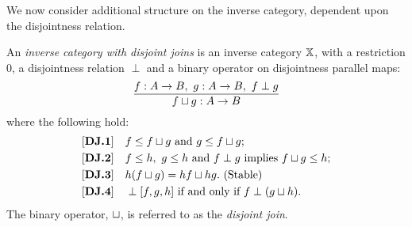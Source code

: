 We now consider additional structure on the inverse category, dependent upon the disjointness
relation.
\begin{definition}\label{def:disjoint_join}
  An \emph{inverse category with disjoint joins} is an inverse category $\mathbb{X}$, with a restriction
  $0$, a disjointness relation $\perp$ and a binary operator on disjointness parallel maps:
  \[
    \infer{f \djoin g : A \to B}{f: A\to B,\ g: A\to B,\ f \perp g}
  \]
  where the following hold:
  \begin{align*}
    \axiom{DJ}{1}\quad & f \le f \djoin g\text{ and }g \le f \djoin g; \\
    \axiom{DJ}{2}\quad & f \le h,\ g \le h\text{ and }f\perp g\text{ implies }f \djoin g \le h;\\
    \axiom{DJ}{3}\quad & h(f \djoin g) = h f \djoin h g. \text{ (Stable)} \\
    \axiom{DJ}{4}\quad & \cdperp [f, g, h]\text{ if and only if }f \perp (g\djoin h).\\
  \end{align*}
  The binary operator, $\sqcup$, is referred to as the \emph{disjoint join}.
\end{definition}

